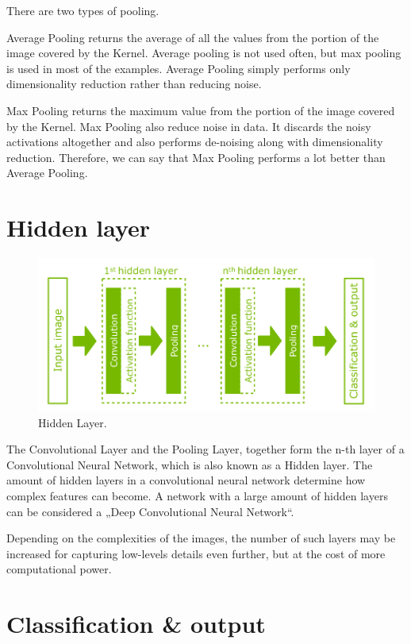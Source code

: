 \documentclass[a4paper,13pt,twoside]{book}
\begin{document}
There are two types of pooling.

Average Pooling returns the average of all the values from the portion of the image covered by the Kernel.
Average pooling is not used often, but max pooling is used in most of the examples.
Average Pooling simply performs only dimensionality reduction rather than reducing noise.

Max Pooling returns the maximum value from the portion of the image covered by the Kernel.
Max Pooling also reduce noise in data. It discards the noisy activations altogether and also performs de-noising along with dimensionality reduction.
Therefore, we can say that Max Pooling performs a lot better than Average Pooling.

\section{Hidden layer}

\begin{figure}[H]
  \includegraphics[width=\linewidth]{Images/hiddenlayer(19).png}
  \caption{Hidden Layer.}
  \label{fig:hiddenlayer}
\end{figure}

The Convolutional Layer and the Pooling Layer, together form the n-th layer of a Convolutional Neural Network, which is also known as a Hidden layer.
The amount of hidden layers in a convolutional neural network determine how complex features can become. A network with a large amount of hidden layers can be considered a „Deep Convolutional Neural Network“.

Depending on the complexities of the images, the number of such layers may be increased for capturing low-levels details even further, but at the cost of more computational power.

\section{Classification & output}
\end{document}

